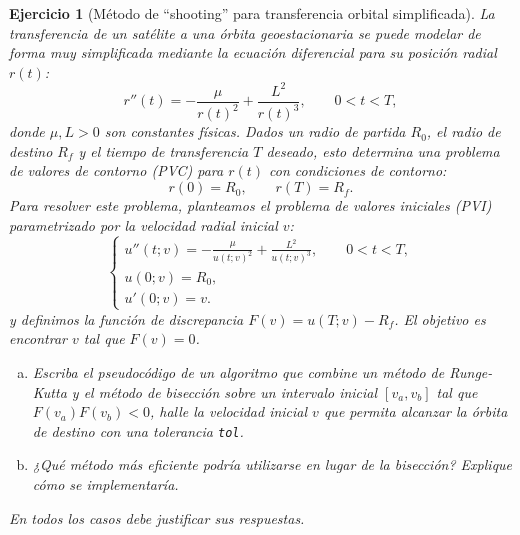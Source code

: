\documentclass[12pt]{article}%
\newtheorem{exercise}{Ejercicio}
\begin{document}
\begin{exercise}[Método de ``shooting'' para transferencia orbital simplificada]
La transferencia de un satélite a una órbita geoestacionaria se puede modelar de forma muy simplificada mediante la ecuación diferencial para su posición radial $r(t)$:
\[
r''(t) = -\frac{\mu}{r(t)^2} + \frac{L^2}{r(t)^3}, \qquad 0 < t < T,
\]
donde $\mu, L > 0$ son constantes físicas. Dados un radio de partida $R_0$, el radio de destino $R_f$ y el tiempo de transferencia $T$ deseado, esto determina una problema de valores de contorno (PVC) para $r(t)$ con condiciones de contorno:
\[
r(0) = R_0, \qquad r(T) = R_f.
\]
Para resolver este problema, planteamos el problema de valores iniciales (PVI) parametrizado por la velocidad radial inicial $v$:
\[
\begin{cases}
u''(t; v) = -\frac{\mu}{u(t; v)^2} + \frac{L^2}{u(t; v)^3}, \qquad 0 < t < T, \\
u(0; v) = R_0, \\ u'(0; v) = v.
\end{cases}
\]
y definimos la función de discrepancia $F(v) = u(T; v) - R_f$. El objetivo es encontrar $v$ tal que $F(v) = 0$.

\begin{enumerate}[(a)]
\item Escriba el pseudocódigo de un algoritmo que combine un método de Runge-Kutta y el método de bisección sobre un intervalo inicial $[v_a, v_b]$ tal que $F(v_a)F(v_b) < 0$, halle la velocidad inicial $v$ que permita alcanzar la órbita de destino con una tolerancia \texttt{tol}. 
\item ¿Qué método más eficiente podría utilizarse en lugar de la bisección? Explique cómo se implementaría.
\end{enumerate}
\end{exercise}

\vskip 2.5cm
\begin{center}
    \textit{En todos los casos debe justificar sus respuestas.}
\end{center}
\end{document}
